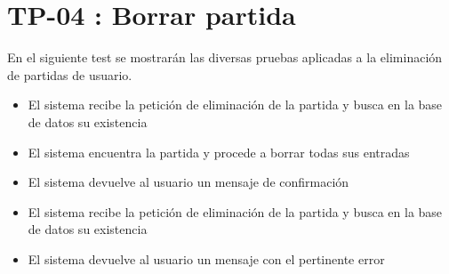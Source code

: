 \section{TP-04 : Borrar partida}\label{sect:TP1}

En el siguiente test se mostrarán las diversas pruebas aplicadas a la eliminación de partidas de usuario.


{
\begin{itemize}
\item  El sistema recibe la petición de eliminación de la partida y busca en la base de datos su existencia
\item El sistema encuentra la partida y procede a borrar todas sus entradas
\item El sistema devuelve al usuario un mensaje de confirmación
\end{itemize}}{}

{
\begin{itemize}
\item  El sistema recibe la petición de eliminación de la partida y busca en la base de datos su existencia
\item El sistema devuelve al usuario un mensaje con el pertinente error
\end{itemize}}{}